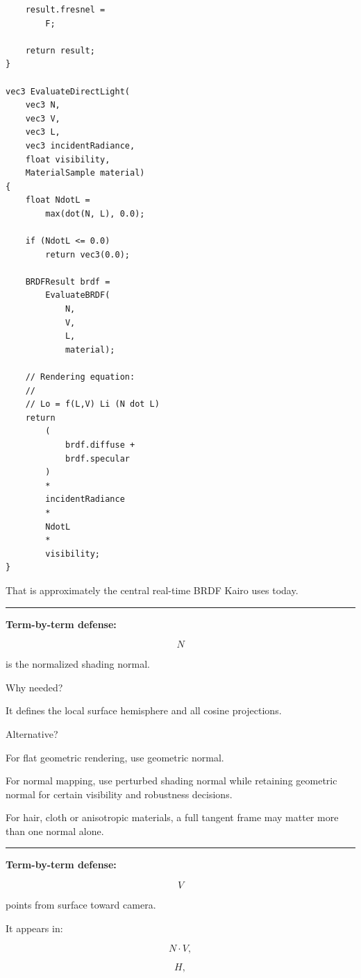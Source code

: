 \begin{verbatim}
    result.fresnel =
        F;

    return result;
}

vec3 EvaluateDirectLight(
    vec3 N,
    vec3 V,
    vec3 L,
    vec3 incidentRadiance,
    float visibility,
    MaterialSample material)
{
    float NdotL =
        max(dot(N, L), 0.0);

    if (NdotL <= 0.0)
        return vec3(0.0);

    BRDFResult brdf =
        EvaluateBRDF(
            N,
            V,
            L,
            material);

    // Rendering equation:
    //
    // Lo = f(L,V) Li (N dot L)
    return
        (
            brdf.diffuse +
            brdf.specular
        )
        *
        incidentRadiance
        *
        NdotL
        *
        visibility;
}
\end{verbatim}

That is approximately the central real-time BRDF Kairo uses today.

\begin{center}\rule{0.5\linewidth}{0.5pt}\end{center}

\textbf{Term-by-term defense: }

\[
N
\]

is the normalized shading normal.

Why needed?

It defines the local surface hemisphere and all cosine projections.

Alternative?

For flat geometric rendering, use geometric normal.

For normal mapping, use perturbed shading normal while retaining geometric normal for certain visibility and robustness decisions.

For hair, cloth or anisotropic materials, a full tangent frame may matter more than one normal alone.

\begin{center}\rule{0.5\linewidth}{0.5pt}\end{center}

\textbf{Term-by-term defense: }

\[
V
\]

points from surface toward camera.

It appears in:

\[
N\cdot V,
\]

\[
H,
\]

